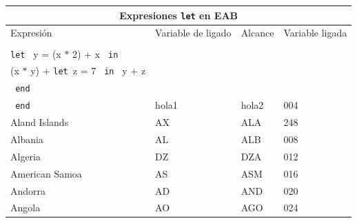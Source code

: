    \bigskip
\begin{turn}{90}
\begin{tabular}{ |p{8cm}|p{6cm}|p{3cm}|p{3cm}|  }
 		\hline
 		\multicolumn{4}{|c|}{Expresiones \texttt{let} en \textsf{EAB}} \\
 		\hline
 		Expresión & Variable de ligado & Alcance & Variable ligada\\
		\hline
  		\makecell[l]{
		    $\texttt{let  } x = \texttt{let }x = (2 + 4) \texttt{ in } x+1 \texttt{ end} \texttt{ in }$ \\  
		     \qquad \texttt{let } y = (x $\ast$ 2) + x \texttt{ in } \\
		    \qquad \qquad (x $\ast$ y) + \texttt{let }z = 7 \texttt{ in }  y + z \\
		    \qquad \texttt{ end } \\ 
		    \texttt{ end } 
		} & hola1 & hola2  &   004\\
		\hline
	 	Aland Islands&   AX  & ALA   &248\\
		\hline
 		Albania &AL & ALB&  008\\
 		\hline
		Algeria    &DZ & DZA&  012\\
		\hline
 		American Samoa&   AS  & ASM&016\\
 		\hline
		Andorra& AD  & AND   &020\\
 		\hline
		Angola& AO  & AGO&024\\
 		\hline
\end{tabular}
\end{turn}

    \bigskip

